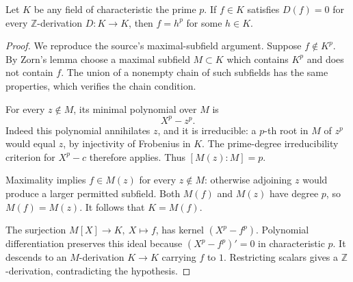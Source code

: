 \begin{srlemma}\label{lem:faithful-field-derivation-root}
Let \(K\) be any field of characteristic the prime \(p\).
If \(f\in K\) satisfies \(D(f)=0\) for every
\(\mathbb Z\)-derivation \(D:K\to K\), then \(f=h^p\)
for some \(h\in K\).
\end{srlemma}
\begin{proof}
We reproduce the source's maximal-subfield argument.
Suppose \(f\notin K^p\).
By Zorn's lemma choose a maximal subfield \(M\subset K\)
which contains \(K^p\) and does not contain \(f\).
The union of a nonempty chain of such subfields has the
same properties, which verifies the chain condition.

For every \(z\notin M\), its minimal polynomial over \(M\) is
\[
                              X^p-z^p.
 \tag{FT1}\label{eq:faithful-pure-minpoly}
\]
Indeed this polynomial annihilates \(z\), and it is
irreducible: a \(p\)-th root in \(M\) of \(z^p\) would equal
\(z\), by injectivity of Frobenius in \(K\).
The prime-degree irreducibility criterion for
\(X^p-c\) therefore applies.
Thus \([M(z):M]=p\).

Maximality implies \(f\in M(z)\) for every \(z\notin M\):
otherwise adjoining \(z\) would produce a larger permitted
subfield.  Both \(M(f)\) and \(M(z)\) have degree \(p\),
so \(M(f)=M(z)\).
It follows that \(K=M(f)\).

The surjection \(M[X]\to K,\ X\mapsto f\), has kernel
\((X^p-f^p)\).
Polynomial differentiation preserves this ideal because
\((X^p-f^p)'=0\) in characteristic \(p\).
It descends to an \(M\)-derivation \(K\to K\) carrying
\(f\) to \(1\).
Restricting scalars gives a \(\mathbb Z\)-derivation,
contradicting the hypothesis.
\end{proof}

